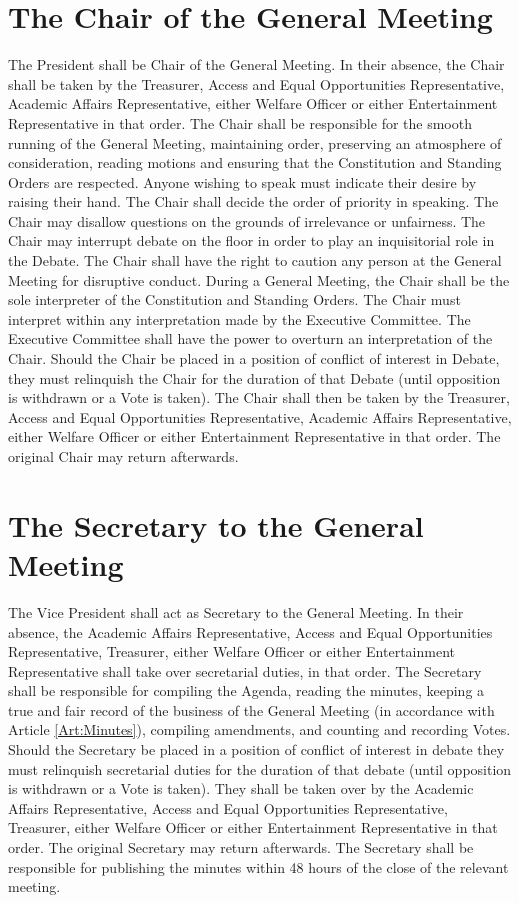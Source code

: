 \section{The Chair of the General Meeting}
\npara The President shall be Chair of the General Meeting. In their absence, the Chair shall be taken by the Treasurer, Access and Equal Opportunities Representative, Academic Affairs Representative, either Welfare Officer or either Entertainment Representative in that order.
\npara The Chair shall be responsible for the smooth running of the General Meeting, maintaining order, preserving an atmosphere of consideration, reading motions and ensuring that the Constitution and Standing Orders are respected.
\npara Anyone wishing to speak must indicate their desire by raising their hand. The Chair shall decide the order of priority in speaking.
\npara The Chair may disallow questions on the grounds of irrelevance or unfairness.
\npara The Chair may interrupt debate on the floor in order to play an inquisitorial role in the Debate.
\npara The Chair shall have the right to caution any person at the General Meeting for disruptive conduct.
\npara During a General Meeting, the Chair shall be the sole interpreter of the Constitution and Standing Orders.  The Chair must interpret within any interpretation made by the Executive Committee.  The Executive Committee shall have the power to overturn an interpretation of the Chair.
\npara Should the Chair be placed in a position of conflict of interest in Debate, they must relinquish the Chair for the duration of that Debate (until opposition is withdrawn or a Vote is taken). The Chair shall then be taken by the Treasurer, Access and Equal Opportunities Representative, Academic Affairs Representative, either Welfare Officer or either Entertainment Representative in that order. The original Chair may return afterwards.
\section{The Secretary to the General Meeting}
\npara The Vice President shall act as Secretary to the General Meeting. In their absence, the Academic Affairs Representative, Access and Equal Opportunities Representative, Treasurer, either Welfare Officer or either Entertainment Representative shall take over secretarial duties, in that order.
\npara The Secretary shall be responsible for compiling the Agenda, reading the minutes, keeping a true and fair record of the business of the General Meeting (in accordance with Article \ref{Art:Minutes}), compiling amendments, and counting and recording Votes.
\npara Should the Secretary be placed in a position of conflict of interest in debate they must relinquish secretarial duties for the duration of that debate (until opposition is withdrawn or a Vote is taken). They shall be taken over by the Academic Affairs Representative, Access and Equal Opportunities Representative, Treasurer, either Welfare Officer or either Entertainment Representative in that order. The original Secretary may return afterwards.
\npara The Secretary shall be responsible for publishing the minutes within 48 hours of the close of the relevant meeting.
